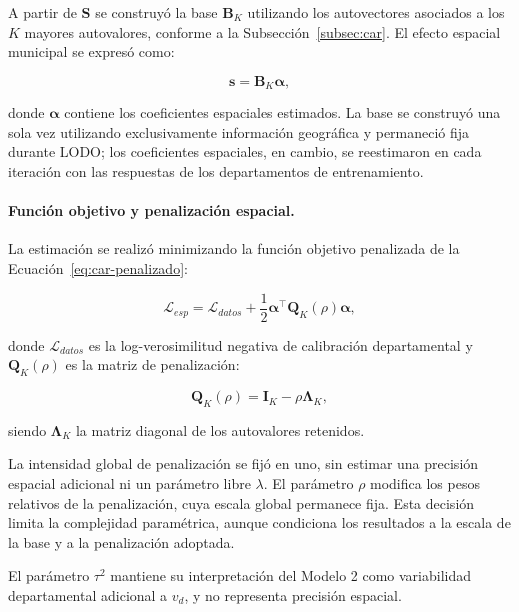 A partir de $\mathbf{S}$ se construyó la base $\mathbf{B}_K$ utilizando los autovectores asociados a los $K$ mayores autovalores, conforme a la Subsección~\ref{subsec:car}. El efecto espacial municipal se expresó como:

\begin{equation}
\mathbf{s}
=
\mathbf{B}_K\boldsymbol{\alpha},
\label{eq:met-m3-espacial}
\end{equation}

donde $\boldsymbol{\alpha}$ contiene los coeficientes espaciales estimados. La base se construyó una sola vez utilizando exclusivamente información geográfica y permaneció fija durante LODO; los coeficientes espaciales, en cambio, se reestimaron en cada iteración con las respuestas de los departamentos de entrenamiento.

\paragraph{Función objetivo y penalización espacial.}

La estimación se realizó minimizando la función objetivo penalizada de la Ecuación~\ref{eq:car-penalizado}:

\begin{equation}
\mathcal{L}_{esp}
=
\mathcal{L}_{datos}
+
\frac{1}{2}
\boldsymbol{\alpha}^{\top}
\mathbf{Q}_K(\rho)
\boldsymbol{\alpha},
\label{eq:met-m3-objetivo}
\end{equation}

donde $\mathcal{L}_{datos}$ es la log-verosimilitud negativa de calibración departamental y $\mathbf{Q}_K(\rho)$ es la matriz de penalización:

\begin{equation}
\mathbf{Q}_K(\rho)
=
\mathbf{I}_K-\rho\boldsymbol{\Lambda}_K,
\label{eq:met-m3-penalizacion}
\end{equation}

siendo $\boldsymbol{\Lambda}_K$ la matriz diagonal de los autovalores retenidos.

La intensidad global de penalización se fijó en uno, sin estimar una precisión espacial adicional ni un parámetro libre $\lambda$. El parámetro $\rho$ modifica los pesos relativos de la penalización, cuya escala global permanece fija. Esta decisión limita la complejidad paramétrica, aunque condiciona los resultados a la escala de la base y a la penalización adoptada.

El parámetro $\tau^2$ mantiene su interpretación del Modelo 2 como variabilidad departamental adicional a $v_d$, y no representa precisión espacial.

